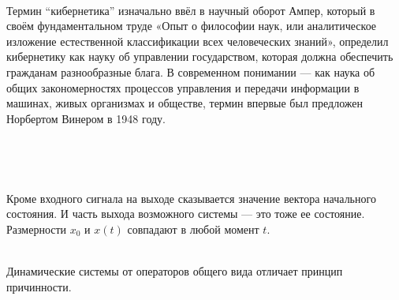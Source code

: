 
\graphicspath{ {imgs/} }





\

Термин ``кибернетика'' изначально ввёл в научный оборот Ампер, который в своём фундаментальном труде «Опыт о философии наук, или аналитическое изложение естественной классификации всех человеческих знаний», определил кибернетику как науку об управлении государством, которая должна обеспечить гражданам разнообразные блага. В современном понимании — как наука об общих закономерностях процессов управления и передачи информации в машинах, живых организмах и обществе, термин впервые был предложен Норбертом Винером в 1948 году. \\


\

\

Кроме входного сигнала на выходе сказывается значение вектора начального состояния. И часть выхода возможного системы — это тоже ее состояние. Размерности $x_0$ и $x(t)$ совпадают в любой момент $t$. \\

\

Динамические системы от операторов общего вида отличает принцип причинности. \\

\


